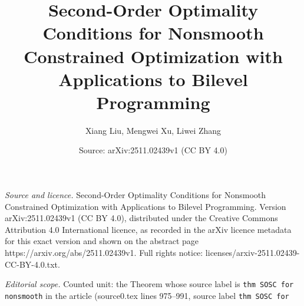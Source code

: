 \documentclass[10pt,a4paper]{amsart}
\title[Second-Order Optimality Conditions for Nonsmooth Constrained]{Second-Order Optimality Conditions for Nonsmooth Constrained Optimization with Applications to Bilevel Programming}
\author{Xiang Liu, Mengwei Xu, Liwei Zhang}
\date{Source: arXiv:2511.02439v1 (CC BY 4.0)}
\begin{document}
\maketitle

\noindent\emph{Source and licence.} Second-Order Optimality Conditions for Nonsmooth Constrained Optimization with Applications to Bilevel Programming. Version arXiv:2511.02439v1 (CC BY 4.0), distributed under the Creative Commons Attribution 4.0 International licence, as recorded in the arXiv licence metadata for this exact version and shown on the abstract page https://arxiv.org/abs/2511.02439v1. Full rights notice: licenses/arxiv-2511.02439-CC-BY-4.0.txt.\par\smallskip

\noindent\textit{Editorial scope.} Counted unit: the Theorem whose source label is \texttt{thm SOSC for
nonsmooth} in the article (source0.tex lines 975--991, source label \texttt{thm SOSC for
}
\end{document}

